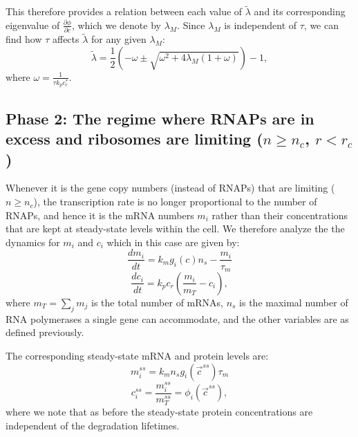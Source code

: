 \documentclass[10pt]{article}
\begin{document}
This therefore provides a relation between each value of $\tilde{\lambda}$ and its corresponding eigenvalue of $\frac{\partial \phi}{\partial c}$, which we denote by $\lambda_M$. Since $\lambda_M$ is independent of $\tau$, we can find how $\tau$ affects $\tilde{\lambda}$ for any given $\lambda_M$:
\begin{equation}
    \tilde{\lambda} = \frac{1}{2}\left(-\omega \pm \sqrt{\omega^2 + 4 \lambda_M (1+\omega)} \right) - 1,
    \label{eqn:lambda_phase1}
\end{equation}
where $\omega = \frac{1}{\tau k_p c^*_r}$.

\subsection{Phase 2: The regime where RNAPs are in excess and ribosomes are limiting ($n \geq n_c$, $r < r_c$)}

Whenever it is the gene copy numbers (instead of RNAPs) that are limiting ($n \geq n_c$), the transcription rate is no longer proportional to the number of RNAPs, and hence it is the mRNA numbers $m_i$ rather than their concentrations that are kept at steady-state levels within the cell. We therefore analyze the the dynamics for $m_i$ and $c_i$ which in this case are given by:
\begin{equation}
    \frac{dm_i}{dt} = k_m g_i({c})n_s - \frac{m_i}{\tau_m}
\end{equation}
\begin{equation}
    \frac{dc_i}{dt} = k_p c_r \left( \frac{m_i}{m_T} - c_i \right),
\end{equation}
where $m_T = \sum_j m_j$ is the total number of mRNAs, $n_s$ is the maximal number of RNA polymerases a single gene can accommodate, and the other variables are as defined previously.

The corresponding steady-state mRNA and protein levels are:
\begin{equation}
    m_i^{ss} = k_m n_s g_i(\vec{c}^{ss}) \tau_m 
\end{equation}
\begin{equation}
    c_i^{ss} = \frac{m_i^{ss}}{m_T^{ss}} = \phi_i(\vec{c}^{ss}),
\end{equation}
where we note that as before the steady-state protein concentrations are independent of the degradation lifetimes.
\end{document}
